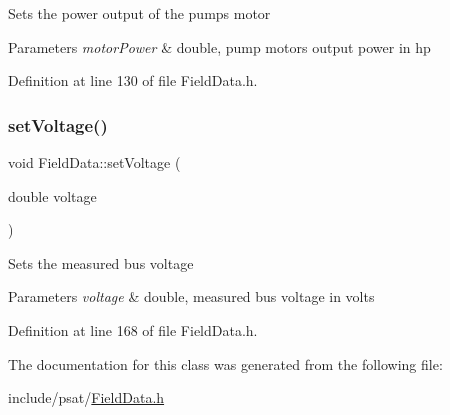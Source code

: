 Sets the power output of the pump\textquotesingle{}s motor


\begin{DoxyParams}{Parameters}
{\em motor\+Power} & double, pump motor\textquotesingle{}s output power in hp \\
\hline
\end{DoxyParams}


Definition at line 130 of file Field\+Data.\+h.

\mbox{\label{class_field_data_a02735cc6956a3fce97bab645ef15dabc}} 
\subsubsection{\texorpdfstring{set\+Voltage()}{setVoltage()}}
{\footnotesize\ttfamily void Field\+Data\+::set\+Voltage (\begin{DoxyParamCaption}\item[{double}]{voltage }\end{DoxyParamCaption})\hspace{0.3cm}{\ttfamily [inline]}}

Sets the measured bus voltage


\begin{DoxyParams}{Parameters}
{\em voltage} & double, measured bus voltage in volts \\
\hline
\end{DoxyParams}


Definition at line 168 of file Field\+Data.\+h.



The documentation for this class was generated from the following file\+:\begin{DoxyCompactItemize}
\item 
include/psat/\hyperlink{_field_data_8h}{Field\+Data.\+h}\end{DoxyCompactItemize}
